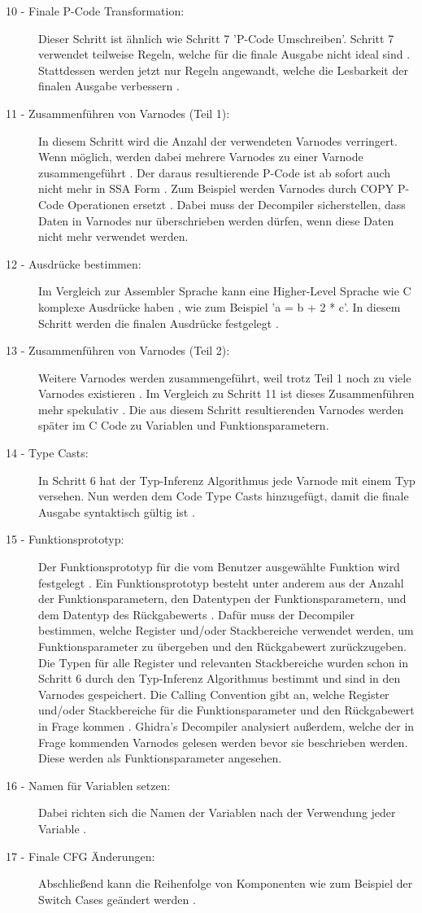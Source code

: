 \begin{description}
\item [10 - Finale P-Code Transformation:] Dieser Schritt ist ähnlich wie Schritt 7 'P-Code Umschreiben'. Schritt 7 verwendet teilweise Regeln, welche für die finale Ausgabe nicht ideal sind \cite{8}. Stattdessen werden jetzt nur Regeln angewandt, welche die Lesbarkeit der finalen Ausgabe verbessern \cite{8}.
\item [11 - Zusammenführen von Varnodes (Teil 1):] In diesem Schritt wird die Anzahl der verwendeten Varnodes verringert. Wenn möglich, werden dabei mehrere Varnodes zu einer Varnode zusammengeführt \cite{8}. Der daraus resultierende P-Code ist ab sofort auch nicht mehr in SSA Form \cite{8}. Zum Beispiel werden Varnodes durch COPY P-Code Operationen ersetzt \cite{8}. Dabei muss der Decompiler sicherstellen, dass Daten in Varnodes nur überschrieben werden dürfen, wenn diese Daten nicht mehr verwendet werden.
\item [12 - Ausdrücke bestimmen:] Im Vergleich zur Assembler Sprache kann eine Higher-Level Sprache wie C komplexe Ausdrücke haben \cite{12}, wie zum Beispiel 'a = b + 2 * c'. In diesem Schritt werden die finalen Ausdrücke festgelegt \cite{8}.
\item [13 - Zusammenführen von Varnodes (Teil 2):] Weitere Varnodes werden zusammengeführt, weil trotz Teil 1 noch zu viele Varnodes existieren \cite{9}. Im Vergleich zu Schritt 11 ist dieses Zusammenführen mehr spekulativ \cite{8}. Die aus diesem Schritt resultierenden Varnodes werden später im C Code zu Variablen und Funktionsparametern.
\item [14 - Type Casts:] In Schritt 6 hat der Typ-Inferenz Algorithmus jede Varnode mit einem Typ versehen. Nun werden dem Code Type Casts hinzugefügt, damit die finale Ausgabe syntaktisch gültig ist \cite{8}.
\item [15 - Funktionsprototyp:] Der Funktionsprototyp für die vom Benutzer ausgewählte Funktion wird festgelegt \cite{8}. Ein Funktionsprototyp besteht unter anderem aus der Anzahl der Funktionsparametern, den Datentypen der Funktionsparametern, und dem Datentyp des Rückgabewerts \cite{10}. Dafür muss der Decompiler bestimmen, welche Register und/oder Stackbereiche verwendet werden, um Funktionsparameter zu übergeben und den Rückgabewert zurückzugeben. Die Typen für alle Register und relevanten Stackbereiche wurden schon in Schritt 6 durch den Typ-Inferenz Algorithmus bestimmt und sind in den Varnodes gespeichert.
Die Calling Convention gibt an, welche Register und/oder Stackbereiche für die Funktionsparameter und den Rückgabewert in Frage kommen \cite{10}. Ghidra's Decompiler analysiert außerdem, welche der in Frage kommenden Varnodes gelesen werden bevor sie beschrieben werden. Diese werden als Funktionsparameter angesehen. 
\item [16 - Namen für Variablen setzen:] Dabei richten sich die Namen der Variablen nach der Verwendung jeder Variable \cite{8}.
\item [17 - Finale CFG Änderungen:] Abschließend kann die Reihenfolge von Komponenten wie zum Beispiel der Switch Cases geändert werden \cite{8}.
\end{description}
